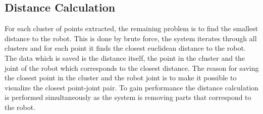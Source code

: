 \subsection{Distance Calculation}
For each cluster of points extracted, the remaining problem is to find the smallest distance to the  robot. This is done by brute force, the system iterates through all clusters and for each point it finds the closest euclidean distance to the robot. The data which is saved is the distance itself, the point in the cluster and the joint of the robot which corresponds to the closest distance. The reason for saving the closest point in the cluster and the robot joint is to make it possible to visualize the closest point-joint pair. To gain performance the distance calculation is performed simultaneously as the system is removing parts that correspond to the robot.